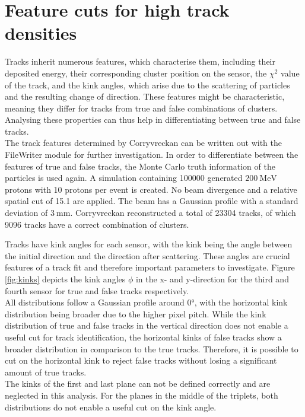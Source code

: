 
\section{Feature cuts for high track densities}\label{sec:feature}
Tracks inherit numerous features, which characterise them,
including their deposited energy, their corresponding cluster position on the sensor, the $\chi^2$ value of the track, and the kink angles, which
arise due to the scattering of particles and the resulting change of direction.
These features might be characteristic, meaning they differ for tracks from true and false combinations of clusters.
Analysing these properties can thus help in differentiating between true and false tracks. \\
The track features determined by Corryvreckan can be written out with the FileWriter module for further investigation.
In order to differentiate between the features of true and false tracks, the Monte Carlo truth information of the particles is used again.
A simulation containing 100000 generated $\SI{200}{\mega\eV}$ protons with 10 protons per event is created. No beam divergence and a relative spatial cut of 15.1 are applied.
The beam has a Gaussian profile with a standard deviation of $\SI{3}{\milli\meter}$.
Corryvreckan reconstructed a total of 23304 tracks, of which 9096 tracks have a correct combination of clusters.

Tracks have kink angles for each sensor, with the kink being
the angle between the initial direction and the direction after scattering. These angles are crucial features of a track fit and therefore important parameters to investigate.
Figure \ref{fig:kinks} depicts the kink angles $\phi$ in the x- and y-direction for the third and fourth sensor for true and false tracks respectively. \\
All distributions follow a Gaussian profile around 0°, with the horizontal kink distribution being broader due to the higher pixel pitch.
While the kink distribution of true and false tracks in the vertical direction does not enable a useful
cut for track identification, the horizontal kinks of false tracks show a broader distribution in comparison to the true tracks. Therefore, it is
possible to cut on the horizontal kink to reject false tracks without losing a significant amount of true tracks. \\
The kinks of the first and last plane can not be defined correctly and are neglected in this analysis. For the planes in the middle of the triplets, both
distributions do not enable a useful cut on the kink angle.

